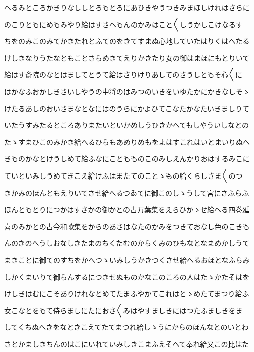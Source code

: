 \documentclass[a4paper,11pt,landscape]{ltjtarticle}
\begin{document}
\par\medskip
へるみところかきりなししとろもとろにあひきやうつきみまほしけれはさらに
\par\medskip
のこりともにめもみやり給はすさへもんのかみはこと〱しうかしこけなるす
\par\medskip
ちをのみこのみてかきたれとふてのをきてすまぬ心地していたはりくはへたる
\par\medskip
けしきなりうたなともことさらめきてえりかきたり女の御はまほにもとりいて
\par\medskip
給はす斎院のなとはましてとうて給はさりけりあしてのさうしともそ心〱に
\par\medskip
はかなふおかしきさいしやうの中将のはみつのいきをいゆたかにかきなしそゝ
\par\medskip
けたるあしのおいさまなとなにはのうらにかよひてこなたかなたいきましりて
\par\medskip
いたうすみたるところありまたいといかめしうひきかへてもしやういしなとの
\par\medskip
たゝすまひこのみかき給へるひらもあめりめもをよはすこれはいとまいりぬへ
\par\medskip
きものかなとけうしめて給ふなにこともものこのみしえんかりおはするみこに
\par\medskip
ていといみしうめてきこえ給けふはまたてのことゝもの給くらしさま〱のつ
\par\medskip
きかみのほんともえりいてさせ給へるつゐてに御このしゝうして宮にさふらふ
\par\medskip
ほんともとりにつかはすさかの御かとの古万葉集をえらひかゝせ給へる四巻延
\par\medskip
喜のみかとの古今和歌集をからのあさはなたのかみをつきておなし色のこきも
\par\medskip
んのきのへうしおなしきたまのちくたむのからくみのひもなとなまめかしうて
\par\medskip
まきことに御てのすちをかへつゝいみしうかきつくさせ給へるおほとなふらみ
\par\medskip
しかくまいりて御らんするにつきせぬものかなこのころの人はたゝかたそはを
\par\medskip
けしきはむにこそありけれなとめてたまふやかてこれはとゝめたてまつり給ふ
\par\medskip
女こなとをもて侍らましにたにおさ〱みはやすましきにはつたふましきをま
\par\medskip
してくちぬへきをなときこえてたてまつれ給しゝうにからのほんなとのいとわ
\par\medskip
さとかましきちんのはこにいれていみしきこまふえそへて奉れ給又この比はた
\par\medskip
\end{document}
